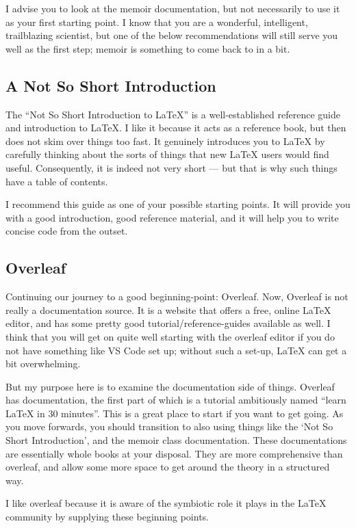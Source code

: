\documentclass[11pt, oneside]{memoir}
\begin{document}
I advise you to look at the memoir documentation, but not necessarily to use it as your first starting point. I know that you are a wonderful, intelligent, trailblazing scientist, but one of the below recommendations will still serve you well as the first step; memoir is something to come back to in a bit.

\subsection{A Not So Short Introduction}

The ``Not So Short Introduction to LaTeX'' is a well-established reference guide and introduction to LaTeX. I like it because it acts as a reference book, but then does not skim over things too fast. It genuinely introduces you to LaTeX by carefully thinking about the sorts of things that new LaTeX users would find useful. Consequently, it is indeed not very short — but that is why such things have a table of contents.

I recommend this guide as one of your possible starting points. It will provide you with a good introduction, good reference material, and it will help you to write concise code from the outset.

\subsection{Overleaf}

Continuing our journey to a good beginning-point: Overleaf. Now, Overleaf is not really a documentation source. It is a website that offers a free, online LaTeX editor, and has some pretty good tutorial/reference-guides available as well. I think that you will get on quite well starting with the overleaf editor if you do not have something like VS Code set up; without such a set-up, LaTeX can get a bit overwhelming.

But my purpose here is to examine the documentation side of things. Overleaf has documentation, the first part of which is a tutorial ambitiously named ``learn LaTeX in 30 minutes''. This is a great place to start if you want to get going. As you move forwards, you should transition to also using things like the `Not So Short Introduction', and the memoir class documentation. These documentations are essentially whole books at your disposal. They are more comprehensive than overleaf, and allow some more space to get around the theory in a structured way.

I like overleaf because it is aware of the symbiotic role it plays in the LaTeX community by supplying these beginning points.
\end{document}
